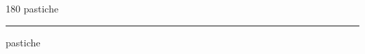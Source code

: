 
\begin{frame}
\begin{center}
\begin{turn}{180}
{\fontsize{2.5cm}{1em}\selectfont pastiche}
\end{turn}
\vspace{1em}\par  
\hrule
\vspace{1em}\par  
{\fontsize{2.5cm}{1em}\selectfont pastiche}
\end{center}
\end{frame}
